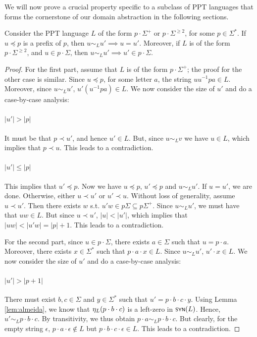 We will now prove a crucial property specific to a subclass of PPT languages that forms the cornerstone of our domain abstraction in the following sections. 
\begin{lemma}\label{lem:prefix-prefix-singleton-ec}
		Consider the PPT language $L$ of the form $p\cdot\Sigma^+$ or $p\cdot\Sigma^{\geq 2}$, for some $p\in \Sigma^*$. If $u \preceq p$ is a prefix of $p$, then $u \sim_L u' \implies u = u'$. Moreover, if $L$ is of the form $p\cdot\Sigma^{\geq 2}$, and $u \in p\cdot\Sigma$, then $u \sim_L u' \implies u' \in p\cdot\Sigma$.
\end{lemma}
\begin{proof}
	For the first part, assume that $L$ is of the form $p\cdot\Sigma^+$; the proof for the other case is similar. Since $u \preceq p$, for some letter $a$, the string $uu^{-1}pa \in L$. Moreover, since $u \sim_L u'$, $u'(u^{-1}pa) \in L$. We now consider the size of $u'$ and do a case-by-case analysis:
	\paragraph{$|u'| > |p|$}
	It must be that $p \prec u'$, and hence $u' \in L$. But, since $u \sim_L v$ we have $u \in L$, which implies that $p \prec u$. This leads to a contradiction.
	\paragraph{$|u'| \leq |p|$}
	This implies that $u' \preceq p$. Now we have $u \preceq p$, $u' \preceq p$ and $u \sim_L u'$. If $u = u'$, we are done. Otherwise, either $u \prec u'$ or $u' \prec u$. Without loss of generality, assume $u \prec u'$. Then there exists $w$ s.t. $u'w \in p\Sigma \subseteq p\Sigma^+$. Since $u \sim_L u'$, we must have that $uw \in L$. But since $u \prec u'$, $|u| < |u'|$, which implies that $|uw| < |u'w| = |p|+1$. This leads to a contradiction.
	
	For the second part, since $u \in p\cdot\Sigma$, there exists $a\in \Sigma$ such that $u = p \cdot a$. Moreover, there exists $x \in \Sigma^*$ such that $p\cdot a\cdot x \in L$. Since $u \sim_L u'$, $u'\cdot x \in L$. We now consider the size of $u'$ and do a case-by-case analysis:
	\paragraph{$|u'| > |p + 1|$}
	There must exist $b,c\in\Sigma$ and $y\in\Sigma^*$ such that $u' = p\cdot b \cdot c\cdot y$. Using Lemma \ref{lem:almeida}, we know that $\eta_{L}(p\cdot b\cdot c)$ is a left-zero in $\synmon{L}$. Hence, $u' \sim_L p\cdot b\cdot c$. By transitivity, we thus obtain $p\cdot a \sim_L p\cdot b\cdot c$. But clearly, for the empty string $\epsilon$, $p\cdot a\cdot\epsilon \notin L$ but $p \cdot b\cdot c\cdot\epsilon\in L$. This leads to a contradiction.

\end{proof}
